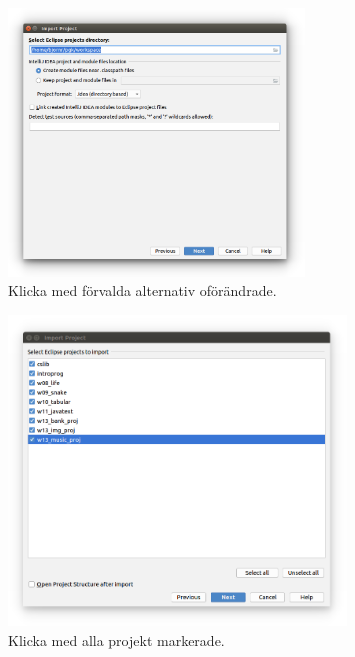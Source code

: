 \begin{figure}[h]
\centering
\includegraphics[width=0.7\textwidth]{../img/intellij/idea-import4-directory.png}
\caption{Klicka  med förvalda alternativ oförändrade.}
\label{fig:idea:import4-directory}
\end{figure}

\begin{figure}
\centering
\includegraphics[width=0.8\textwidth]{../img/intellij/idea-import5-select-projects.png}
\caption{Klicka  med alla projekt markerade.}
\label{fig:idea:import5-select-projects}
\end{figure}

